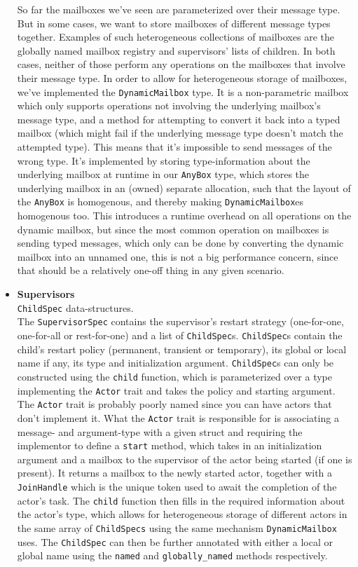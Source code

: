 \documentclass[a4paper]{article}
\begin{document}
\begin{itemize}
So far the mailboxes we've seen are parameterized over their message type. But in
some cases, we want to store mailboxes of different message types together.
Examples of such heterogeneous collections of mailboxes are the globally named
mailbox registry and supervisors' lists of children. In both cases, neither of
those perform any operations on the mailboxes that involve their message type.
In order to allow for heterogeneous storage of mailboxes, we've implemented the
\texttt{DynamicMailbox} type. It is a non-parametric mailbox which only supports
operations not involving the underlying mailbox's message type, and a method for
attempting to convert it back into a typed mailbox (which might fail if the
underlying message type doesn't match the attempted type). This means that it's
impossible to send messages of the wrong type.
It's implemented by
storing type-information about the underlying mailbox at runtime in our
\texttt{AnyBox} type, which stores the underlying mailbox in an (owned) separate
allocation, such that the layout of the \texttt{AnyBox} is homogenous, and
thereby making \texttt{DynamicMailbox}es homogenous too.
This introduces a runtime overhead on
all operations on the dynamic mailbox, but since the most common operation on
mailboxes is sending typed messages, which only can be done by converting the
dynamic mailbox into an unnamed one, this is not a big performance concern,
since that should be a relatively one-off thing in any given scenario.

\item{\bf Supervisors} \\

\texttt{ChildSpec} data-structures. \\ The \texttt{SupervisorSpec} contains the
supervisor's restart strategy (one-for-one, one-for-all or rest-for-one) and a
list of \texttt{ChildSpec}s. \texttt{ChildSpec}s contain the child's restart
policy (permanent, transient or temporary), its global or local name if any,
its type and initialization argument. \texttt{ChildSpec}s can only be
constructed using the \texttt{child} function, which is parameterized over a type
implementing the \texttt{Actor} trait and takes the policy and starting
argument. The \texttt{Actor} trait is probably poorly named since you can have
actors that don't implement it. What the \texttt{Actor} trait is responsible for
is associating a message- and argument-type with a given struct and requiring
the implementor to define a \texttt{start} method, which takes in an
initialization argument and a mailbox to the supervisor of the actor being
started (if one is present). It returns a mailbox to the newly started actor,
together with a \texttt{JoinHandle} which is the unique token used to await the
completion of the actor's task. The \texttt{child} function then fills in the
required information about the actor's type, which allows for heterogeneous
storage of different actors in the same array of \texttt{ChildSpecs} using the
same mechanism \texttt{DynamicMailbox} uses. The \texttt{ChildSpec} can then be
further annotated with either a local or global name using the \texttt{named} and
\texttt{globally\_named} methods respectively.


\end{itemize}
\end{document}
